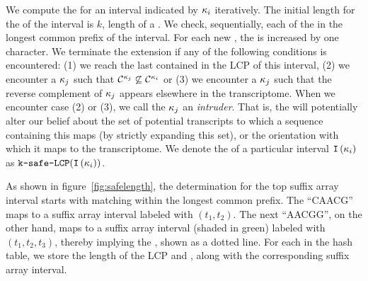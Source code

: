 We compute the \kslcp for an interval indicated by \kmer ${\kappa}_i$ iteratively. The 
initial length for the \kslcp of the interval is $k$, length of a \kmer. We check, 
sequentially, each of the \kmers in the longest common prefix of the interval. For each 
new \kmer, the \kslcp is increased by one character. We terminate the \kslcp extension if 
any of the following conditions is encountered: (1) we reach the last \kmer contained 
in the LCP of this interval, (2) we encounter a \kmer ${\kappa}_j$ such that 
$\mathcal{C}^{{\kappa}_j} \not \subseteq \mathcal{C}^{{\kappa}_i}$ or (3) we 
encounter a \kmer ${\kappa}_j$ such that the reverse complement of ${\kappa}_j$ 
appears elsewhere in the transcriptome. When we encounter case (2) or (3), we call the 
\kmer ${\kappa}_j$ an \emph{intruder}.  That is, the \kmer will potentially alter our 
belief about the set of potential transcripts to which a sequence containing this \kmer 
maps (by strictly expanding this set), or the orientation with which it maps to the 
transcriptome.  We denote the \kslcp of a particular interval $\texttt{I}\left({\kappa}_i\right)$ 
as $\mathrm{\texttt{k-safe-LCP}}(\texttt{I}\left({\kappa}_i\right))$.

As shown in figure~\cref{fig:safelength}, the \kslcp determination for the top suffix 
array interval starts with matching \kmers within the longest common prefix. The 
\kmer ``CAACG'' maps to a suffix array interval labeled with $(t_1,t_2)$. The next 
\kmer ``AACGG'', on the other hand, maps to a suffix array interval (shaded in green) 
labeled with $(t_1,t_2,t_3)$, thereby implying the \kslcp, shown as a dotted line. For 
each \kmer in the hash table, we store the length of the LCP and \kslcp, along with 
the corresponding suffix array interval.

